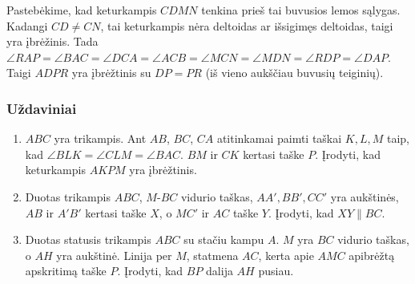 \begin{sprendimas}
  Pastebėkime, kad keturkampis $CDMN$ tenkina prieš tai
  buvusios lemos sąlygas. Kadangi $CD\neq CN$, tai keturkampis
  nėra deltoidas ar išsigimęs deltoidas, taigi yra įbrėžinis.
  Tada $\angle RAP=\angle BAC=\angle DCA=\angle ACB=\angle
  MCN=\angle MDN=\angle RDP=\angle DAP$. Taigi $ADPR$ yra
  įbrėžtinis su $DP=PR$ (iš vieno aukščiau buvusių teiginių).
\end{sprendimas}

\subsubsection{Uždaviniai}

\begin{enumerate}
\item $ABC$ yra trikampis. Ant $AB$, $BC$, $CA$ atitinkamai
  paimti taškai $K,L,M$ taip, kad $\angle BLK=\angle
  CLM=\angle BAC$. $BM$ ir $CK$ kertasi taške $P$. Įrodyti,
  kad keturkampis $AKPM$ yra įbrėžtinis.
\item Duotas trikampis $ABC$, $M$-$BC$ vidurio taškas,
  $AA',BB',CC'$ yra aukštinės, $AB$ ir $A'B'$ kertasi taške
  $X$, o $MC'$ ir $AC$ taške $Y$. Įrodyti, kad
  $XY\parallel{BC}$.
\item Duotas statusis trikampis $ABC$ su stačiu kampu $A$.
  $M$ yra $BC$ vidurio taškas, o $AH$ yra aukštinė. Linija
  per $M$, statmena $AC$, kerta apie $AMC$ apibrėžtą
  apskritimą taške $P$. Įrodyti, kad $BP$ dalija $AH$
  pusiau.

\end{enumerate}

